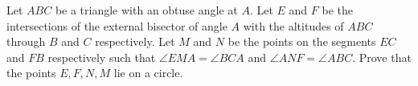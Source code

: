 Let $ABC$ be a triangle with an obtuse angle at $A$. Let $E$ and $F$ be the intersections of the external bisector of angle $A$ with the altitudes of $ABC$ through $B$ and $C$ respectively. Let $M$ and $N$ be the points on the segments $EC$ and $FB$ respectively such that $\angle EMA = \angle BCA$ and $\angle ANF = \angle ABC$. Prove that the points $E, F, N, M$ lie on a circle.